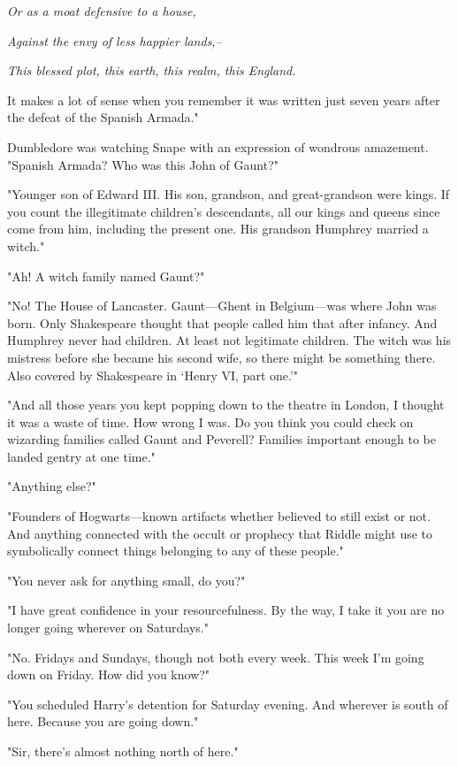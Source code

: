 \emph{Or as a moat defensive to a house,}

\emph{Against the envy of less happier lands,--}

\emph{This blessed plot, this earth, this realm, this England.}

It makes a lot of sense when you remember it was written just seven years after the defeat of the Spanish Armada."

Dumbledore was watching Snape with an expression of wondrous amazement. "Spanish Armada? Who was this John of Gaunt?"

"Younger son of Edward III. His son, grandson, and great-grandson were kings. If you count the illegitimate children's descendants, all our kings and queens since come from him, including the present one. His grandson Humphrey married a witch."

"Ah! A witch family named Gaunt?"

"No! The House of Lancaster. Gaunt—Ghent in Belgium—was where John was born. Only Shakespeare thought that people called him that after infancy. And Humphrey never had children. At least not legitimate children. The witch was his mistress before she became his second wife, so there might be something there. Also covered by Shakespeare in{\el} `Henry VI, part one.'"

"And all those years you kept popping down to the theatre in London, I thought it was a waste of time. How wrong I was. Do you think you could check on wizarding families called Gaunt and Peverell? Families important enough to be landed gentry at one time."

"Anything else?"

"Founders of Hogwarts—known artifacts whether believed to still exist or not. And anything connected with the occult or prophecy that Riddle might use to symbolically connect things belonging to any of these people."

"You never ask for anything small, do you?"

"I have great confidence in your resourcefulness. By the way, I take it you are no longer going{\el} wherever{\el} on Saturdays."

"No. Fridays and Sundays, though not both every week. This week I'm going down on Friday. How did you know?"

"You scheduled Harry's detention for Saturday evening. And{\el} wherever{\el} is south of here. Because you are going down."

"Sir, there's almost nothing north of here."

